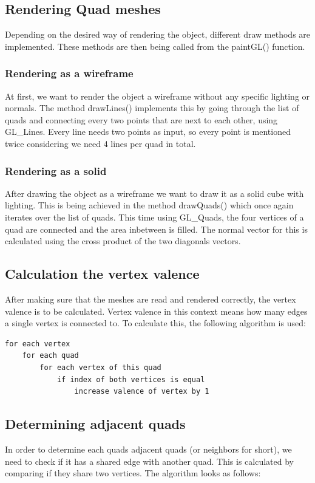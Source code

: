 \documentclass[12pt,a4paper]{scrartcl}
\begin{document}
\subsection{Rendering Quad meshes}
Depending on the desired way of rendering the object, different draw methods are implemented. These methods are then being called from the paintGL() function.

\subsubsection{Rendering as a wireframe}
At first, we want to render the object a wireframe without any specific lighting or normals. The method drawLines() implements this by going through the list of quads and connecting every two points that are next to each other, using GL_Lines. Every line needs two points as input, so every point is mentioned twice considering we need 4 lines per quad in total.

\subsubsection{Rendering as a solid}
After drawing the object as a wireframe we want to draw it as a solid cube with lighting. This is being achieved in the method drawQuads() which once again iterates over the list of quads. This time using GL_Quads, the four vertices of a quad are connected and the area inbetween is filled. The normal vector for this is calculated using the cross product of the two diagonals vectors.

\subsection{Calculation the vertex valence}
After making sure that the meshes are read and rendered correctly, the vertex valence is to be calculated. Vertex valence in this context means how many edges a single vertex is connected to. To calculate this, the following algorithm is used:


\begin{lstlisting}[language=PSEUDO]
for each vertex 
	for each quad 
 		for each vertex of this quad
   			if index of both vertices is equal 
   				increase valence of vertex by 1
\end{lstlisting}

\subsection{Determining adjacent quads}
In order to determine each quads adjacent quads (or neighbors for short), we need to check if it has a shared edge with another quad. This is calculated by comparing if they share two vertices. The algorithm looks as follows:
\end{document}
